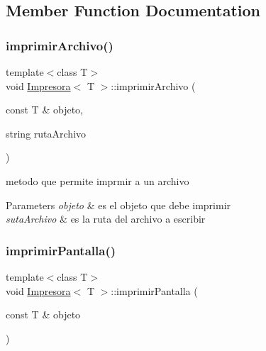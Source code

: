\subsection{Member Function Documentation}
\mbox{\label{class_impresora_ac63e5482787086f73c351732f4731239}} 
\subsubsection{\texorpdfstring{imprimir\+Archivo()}{imprimirArchivo()}}
{\footnotesize\ttfamily template$<$class T$>$ \\
void \hyperlink{class_impresora}{Impresora}$<$ T $>$\+::imprimir\+Archivo (\begin{DoxyParamCaption}\item[{const T \&}]{objeto,  }\item[{string}]{ruta\+Archivo }\end{DoxyParamCaption})\hspace{0.3cm}{\ttfamily [inline]}}



metodo que permite imprmir a un archivo 


\begin{DoxyParams}{Parameters}
{\em objeto} & es el objeto que debe imprimir \\
\hline
{\em suta\+Archivo} & es la ruta del archivo a escribir \\
\hline
\end{DoxyParams}
\mbox{\label{class_impresora_a7427f11d194603c5ae2b7f4837c49f14}} 
\subsubsection{\texorpdfstring{imprimir\+Pantalla()}{imprimirPantalla()}}
{\footnotesize\ttfamily template$<$class T$>$ \\
void \hyperlink{class_impresora}{Impresora}$<$ T $>$\+::imprimir\+Pantalla (\begin{DoxyParamCaption}\item[{const T \&}]{objeto }\end{DoxyParamCaption})\hspace{0.3cm}{\ttfamily [inline]}}



